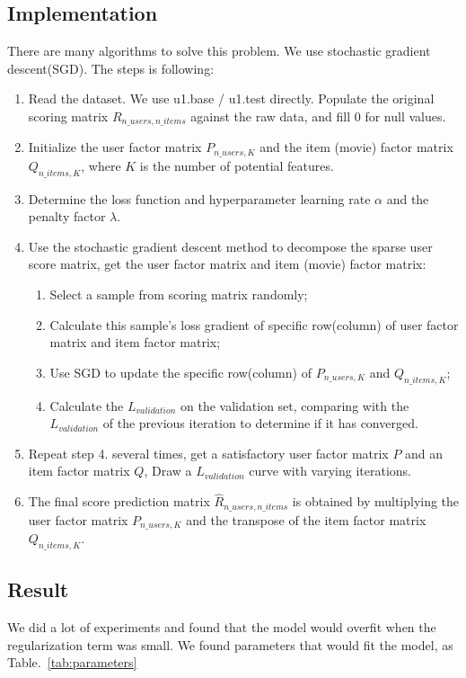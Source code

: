 \documentclass[journal, a4paper]{IEEEtran}
\begin{document}
\subsection{Implementation}

    There are many algorithms to solve this problem. We use stochastic gradient descent(SGD). The steps is following:
    
    \begin{enumerate}[1.]
        \item Read the dataset. We use u1.base / u1.test directly. Populate the original scoring matrix $R_{n\_users,n\_items}$ against the raw data, and fill 0 for null values.
        \item Initialize the user factor matrix $P_{n\_users,K}$ and the item (movie) factor matrix $Q_{n\_items,K}$, where $K$ is the number of potential features.
        \item Determine the loss function and hyperparameter learning rate $\alpha$ and the penalty factor $\lambda$.
        \item Use the stochastic gradient descent method to decompose the sparse user score matrix, get the user factor matrix and item (movie) factor matrix:

        \begin{enumerate}[(1)]
            \item Select a sample from scoring matrix randomly;
            \item Calculate this sample's loss gradient of specific row(column) of user factor matrix and item factor matrix;
            \item Use SGD to update the specific row(column) of $P_{n\_users,K}$ and $Q_{n\_items,K}$;
            \item Calculate the $L_{validation}$ on the validation set, comparing with the $L_{validation}$ of the previous iteration to determine if it has converged.
        \end{enumerate}
        \item Repeat step 4. several times, get a satisfactory user factor matrix $P$ and an item factor matrix $Q$, Draw a $L_{validation}$ curve with varying iterations.
        \item The final score prediction matrix $\hat{R}_{n\_users,n\_items}$ is obtained by multiplying the user factor matrix $P_{n\_users,K}$ and the transpose of the item factor matrix $Q_{n\_items,K}$.
    \end{enumerate}
    
\subsection{Result}
    We did a lot of experiments and found that the model would overfit when the regularization term was small.
    We found parameters that would fit the model, as Table.~\ref{tab:parameters}
	
\end{document}
